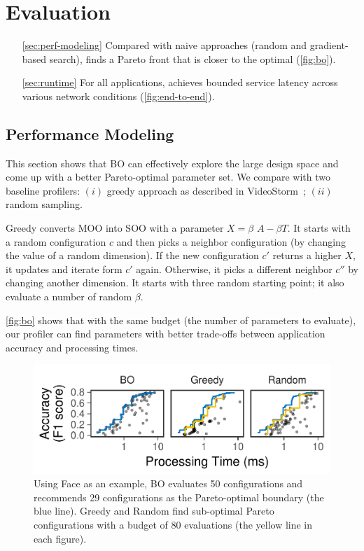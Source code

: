 \section{Evaluation}
\label{sec:evaluation}

\begin{itemize}[itemsep=0pt, topsep=1pt]
\item[\autoref{sec:perf-modeling}] Compared with naive approaches (random and
  gradient-based search), \sysname{} finds a Pareto front that is closer to the
  optimal (\autoref{fig:bo}).
\item[\autoref{sec:runtime}] For all applications, \sysname{} achieves bounded
  service latency across various network conditions (\autoref{fig:end-to-end}).
\end{itemize}

\subsection{Performance Modeling}
\label{sec:perf-modeling}

This section shows that BO can effectively explore the large design space and
come up with a better Pareto-optimal parameter set. We compare \sysname{} with
two baseline profilers: $(i)$ greedy approach as described in
VideoStorm~\cite{zhang2017live}; $(ii)$ random sampling.

Greedy converts MOO into SOO with a parameter $X = \beta$ $A - \beta T$. It
starts with a random configuration $c$ and then picks a neighbor configuration
(by changing the value of a random dimension). If the new configuration $c'$
returns a higher $X$, it updates and iterate form $c'$ again. Otherwise, it
picks a different neighbor $c''$ by changing another dimension. It starts with
three random starting point; it also evaluate a number of random $\beta$.

\autoref{fig:bo} shows that with the same budget (the number of parameters to
evaluate), our profiler can find parameters with better trade-offs between
application accuracy and processing times.

\begin{figure}
  \centering
  \includegraphics[width=0.95\columnwidth]{figures/profiling.pdf}
  \caption{Using Face as an example, BO evaluates 50 configurations and
    recommends 29 configurations as the Pareto-optimal boundary (the blue
    line). Greedy and Random find sub-optimal Pareto configurations with a
    budget of 80 evaluations (the yellow line in each figure).}
  \label{fig:bo}
\end{figure}

